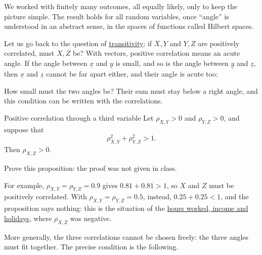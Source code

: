 \documentclass[a4paper,12pt,oneside]{report}
\begin{document}
We worked with finitely many outcomes, all equally likely, only to keep the
picture simple. The result holds for all random variables, once ``angle''
is understood in an abstract sense, in the spaces of functions called
Hilbert spaces.

Let us go back to the question of
\hyperref[sec:corr-transitivity]{transitivity}: if $X,Y$ and $Y,Z$ are
positively correlated, must $X,Z$ be? With vectors, positive correlation
means an acute angle. If the angle between $\underline{x}$ and
$\underline{y}$ is small, and so is the angle between $\underline{y}$ and
$\underline{z}$, then $\underline{x}$ and $\underline{z}$ cannot be far
apart either, and their angle is acute too:
\begin{center}
\end{center}
How small must the two angles be? Their sum must stay below a right angle,
and this condition can be written with the correlations.

\begin{framedprop}{Positive correlation through a third variable}\label{prop:corr-transitive}
Let $\rho_{X,Y}>0$ and $\rho_{Y,Z}>0$, and suppose that
\[
\rho_{X,Y}^2+\rho_{Y,Z}^2>1 .
\]
Then $\rho_{X,Z}>0$.
\end{framedprop}

\begin{todobox}Prove this proposition: the proof was not given in class.\end{todobox}

For example, $\rho_{X,Y}=\rho_{Y,Z}=0.9$ gives $0.81+0.81>1$, so $X$ and
$Z$ must be positively correlated. With $\rho_{X,Y}=\rho_{Y,Z}=0.5$,
instead, $0.25+0.25<1$, and the proposition says nothing: this is the
situation of the \hyperref[ex:work-holidays]{hours worked, income and
holidays}, where $\rho_{X,Z}$ was negative.

More generally, the three correlations cannot be chosen freely: the three
angles must fit together. The precise condition is the following.
\end{document}
